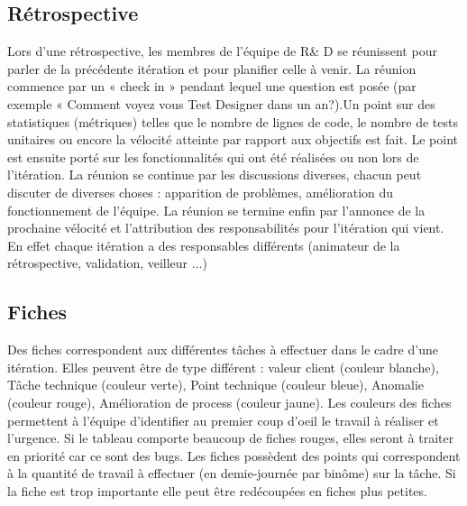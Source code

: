\subsection{Rétrospective}
Lors d'une rétrospective,  les membres de l'équipe de R\& D se réunissent pour parler de la précédente itération et pour planifier celle à venir. La réunion commence par un « check in » pendant lequel une question est posée (par exemple « Comment voyez vous Test Designer dans un an?).Un point sur des statistiques (métriques) telles que le nombre de lignes de code, le nombre de tests unitaires ou encore la vélocité atteinte par rapport aux objectifs est fait. Le point est ensuite porté sur les fonctionnalités qui ont été réalisées ou non lors de l'itération. La réunion se continue par les discussions diverses, chacun peut discuter de diverses choses : apparition de problèmes, amélioration du fonctionnement de l'équipe. La réunion se termine enfin par l'annonce de la prochaine vélocité et l'attribution des responsabilités pour l'itération qui vient. En effet chaque itération a des responsables différents (animateur de la rétrospective, validation, veilleur ...)
\subsection{Fiches}
Des fiches correspondent aux différentes t\^aches à effectuer dans le cadre d'une itération. Elles peuvent \^etre de type différent : valeur client (couleur blanche), T\^ache technique (couleur verte), Point technique (couleur bleue), Anomalie (couleur rouge), Amélioration de process (couleur jaune). Les couleurs des fiches permettent à l'équipe d'identifier au premier coup d'oeil le travail à réaliser et l'urgence. Si le tableau comporte beaucoup de fiches rouges, elles seront à traiter en priorité car ce sont des bugs. Les fiches possèdent des points qui correspondent à la quantité de travail à effectuer (en demie-journée par bin\^ome) sur la t\^ache. Si la fiche est trop importante elle peut \^etre redécoupées en fiches plus petites.

%
%

